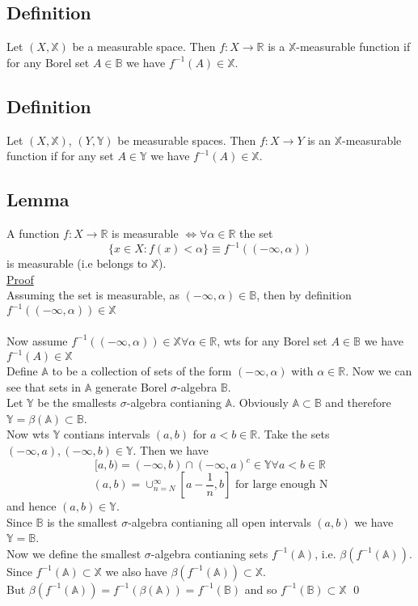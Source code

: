 \documentclass[a4paper, 12pt, twoside]{article}
\begin{document}
        \subsection{Definition}
            Let $(X,\mathbb{X})$ be a measurable space. Then $f:X \to  \mathbb{R}$ is a $\mathbb{X}$-measurable function if for any Borel set $A\in \mathbb{B}$ we have $f^{-1}(A)\in \mathbb{X}$.
        \subsection{Definition}
            Let $(X,\mathbb{X})$, $(Y,\mathbb{Y})$ be measurable spaces. Then $f:X \to  Y$ is an $\mathbb{X}$-measurable function if for any set $A\in \mathbb{Y}$ we have $f^{-1}(A)\in \mathbb{X}$.
        \newpage
        \subsection{Lemma}
            A function $f:X \to  \mathbb{R}$ is measurable $ \iff \forall \alpha \in \mathbb{R}$ the set
            $$ \{x\in X:f(x)<\alpha\} \equiv f^{-1}((-\infty,\alpha))$$
            is measurable (i.e belongs to $\mathbb{X}$).\\
            \noindent
            \underline{Proof}\\
            Assuming the set is measurable, as $(-\infty,\alpha)\in \mathbb{B}$, then by definition $f^{-1}((-\infty,\alpha))\in \mathbb{X}$\\\\
            Now assume $f^{-1}((-\infty,\alpha))\in \mathbb{X} \forall \alpha\in \mathbb{R}$, wts  for any Borel set $A\in \mathbb{B}$ we have $f^{-1}(A)\in \mathbb{X}$\\
            Define $\mathbb{A}$ to be a collection of sets of the form $(-\infty,\alpha) $ with $\alpha \in \mathbb{R}$. Now we can see that sets in $\mathbb{A}$ generate Borel $\sigma$-algebra $\mathbb{B}$.\\
            Let $\mathbb{Y}$ be the smallests $\sigma$-algebra contianing $\mathbb{A}$. Obviously $\mathbb{A}\subset \mathbb{B}$ and therefore $\mathbb{Y}=\beta(\mathbb{A})\subset \mathbb{B}$.\\
            Now wts $\mathbb{Y}$ contians intervals $(a,b)$ for $a<b\in \mathbb{R}$. Take the sets $(-\infty,a),(-\infty,b) \in \mathbb{Y}$. Then we have
            $$ [a,b)=(-\infty,b)\cap (-\infty,a)^{c}\in \mathbb{Y} \forall a<b\in \mathbb{R}$$
            $$(a,b)=\cup_{n=N}^{\infty}[a- \frac{1}{n},b] \text{ for large enough N}$$
            and hence $(a,b)\in \mathbb{Y}$.\\
            Since $\mathbb{B}$ is the smallest $\sigma$-algebra contianing all open intervals $(a,b)$ we have $\mathbb{Y}=\mathbb{B}$.\\
            Now we define the smallest $\sigma$-algebra contianing sets $f^{-1}(\mathbb{A})$, i.e. $\beta(f^{-1}(\mathbb{A}))$. Since $f^{-1}(\mathbb{A})\subset \mathbb{X}$ we also have $\beta (f^{-1} (\mathbb{A})) \subset \mathbb{X}$.\\
            But $\beta(f^{-1}(\mathbb{A})) = f^{-1}(\beta(\mathbb{A} )) = f^{-1}(\mathbb{B}) $ and so $ f^{-1}(\mathbb{B}) \subset \mathbb{X}$ \qed
\end{document}

